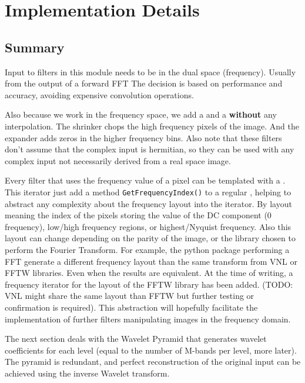 \documentclass{InsightArticle}
\theoremstyle{definition}
\begin{document}
\section{Implementation Details}
\label{sec:Impl}
\subsection{Summary}
\label{sub:Summary}

Input to filters in this module needs to be in the dual space (frequency). Usually from the output of a forward FFT  The decision is based on performance and accuracy, avoiding expensive convolution operations.

Also because we work in the frequency space, we add a  and a  \textbf{without} any interpolation. The shrinker chops the high frequency pixels of the image. And the expander adds zeros in the higher frequency bins. Also note that these filters don't assume that the complex input is hermitian, so they can be used with any complex input not necessarily derived from a real space image.

Every filter that uses the frequency value of a pixel can be templated with a .\newline
This iterator just add  a method \lstinline[columns=fixed]{GetFrequencyIndex()} to a regular , helping to abstract any complexity about the frequency layout into the iterator. By layout meaning the index of the pixels storing the value of the DC component (0 frequency), low/high frequency regions, or highest/Nyquist frequency. Also this layout can change depending on the parity of the image, or the library chosen to perform the Fourier Transform. For example, the python package performing a FFT generate a different frequency layout than the same transform from VNL or FFTW libraries. Even when the results are equivalent. At the time of writing, a frequency iterator for the layout of the FFTW library has been added. (TODO: VNL might share the same layout than FFTW but further testing or confirmation is required).\newline
This abstraction will hopefully facilitate the implementation of further filters manipulating images in the frequency domain.

The next section deals with the Wavelet Pyramid that generates wavelet coefficients for each level (equal to the number of M-bands per level, more later).  The pyramid is redundant, and perfect reconstruction of the original input can be achieved using the inverse Wavelet transform.
\end{document}

